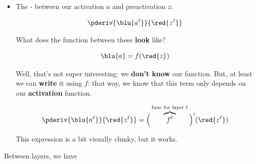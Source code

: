         \begin{itemize}
            \item The  - between our activation $a$ and preactivation $z$:
            
                \begin{equation}
                    \pderiv {\blu{a^\ell}}   {\red{z^\ell}}
                \end{equation}
                
                What does the function between these \textbf{look} like?
                
                \begin{equation}
                    \blu{a} = f(\red{z})
                \end{equation}
                
                Well, that's not super interesting: we \textbf{don't know }our function. But, at least we can \textbf{write} it using $f$: that way, we know that this term only depends on our \textbf{activation} function.
                
                \begin{equation}
                    \pderiv {\blu{a^\ell}}   {\red{z^\ell}} 
                    = 
                    \Big(
                        \overbrace{
                        f^\ell 
                        }^{\text{func for layer $\ell$}}
                    \Big)'
                    (
                        \red{z^\ell}
                    )
                \end{equation}
                
                This expression is a bit visually clunky, but it works.
                
        \end{itemize}
        
    Between layers, we have
        

